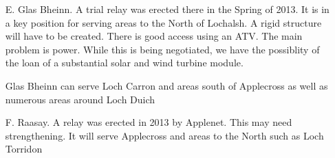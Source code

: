 \begin{itemize}
\item[E.] Glas Bheinn.  A trial relay was erected there in the Spring
  of 2013.  It is in a key position for serving areas to the
  North of Lochalsh.  A rigid structure will have to be created.
  There is good access using an ATV.  The main problem is power.
  While this is being negotiated, we have the possiblity of the loan
  of a substantial solar and wind turbine module.

  Glas Bheinn can serve Loch Carron and areas south of Applecross as
  well as numerous areas around Loch Duich

\item[F.] Raasay.  A relay was erected in 2013 by Applenet.  This may
  need strengthening.  It will serve Applecross and areas to the North
  such as Loch Torridon

\end{itemize}

